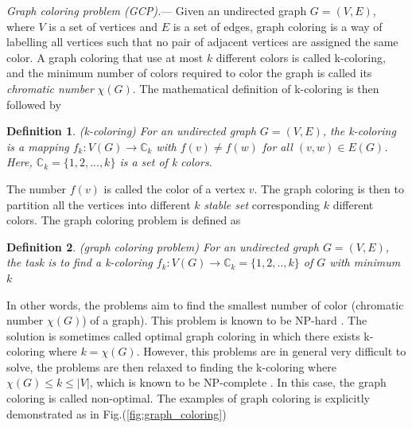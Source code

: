 \documentclass[%
 reprint,
nofootinbib,
 amsmath,amssymb,
 aps,
pra,
floatfix,
]{revtex4-2}
\newtheorem{definition}{Definition}
\begin{document}
\emph{Graph coloring problem (GCP).}--- Given an undirected graph $G=(V,E)$, where $V$ is a set of vertices and $E$ is a set of edges, graph coloring is a way of labelling all vertices such that no pair of adjacent vertices are assigned the same color. A graph coloring that use at most $k$ different colors is called k-coloring, and the minimum number of colors required to color the graph is called its \emph{chromatic number} $\chi(G)$. The mathematical definition of k-coloring is then followed by
\begin{definition}
\label{def:k-coloring}
{\rm (k-coloring)} For an undirected graph $G = (V,E)$, the k-coloring is a mapping $f_k: V(G) \to \mathbb{C}_k$ with $f(v)\neq f(w)$ for all $(v,w) \in E(G)$. Here, $\mathbb{C}_k = \{1,2,...,k\}$ is a set of k colors.
\end{definition}
The number $f(v)$ is called the color of a vertex $v$. The graph coloring is then to partition all the vertices into different $k$ \emph{stable set} corresponding $k$ different colors. The graph coloring problem is defined as 
\begin{definition}
\label{def:k-color}
{\rm (graph coloring problem)} For an undirected graph $G = (V,E)$, the task is to find a k-coloring  $f_k: V(G) \to \mathbb{C}_k = \{1,2,..,k \}$ of $G$ with minimum $k$
\end{definition}
In other words, the problems aim to find the smallest number of color (chromatic number $\chi(G)$) of a graph). This problem is known to be NP-hard \cite{Garey1976TheColoring}. The solution is sometimes called optimal graph coloring in which there exists k-coloring where $k=\chi(G)$. However, this problems are in general very difficult to solve, the problems are then relaxed to finding the k-coloring where $\chi(G)\leq k \leq |V|$, which is known to be NP-complete \cite{Karp1972ReducibilityProblems}. In this case, the graph coloring is called non-optimal. The examples of graph coloring is explicitly demonstrated as in Fig.(\ref{fig:graph_coloring})
\end{document}
